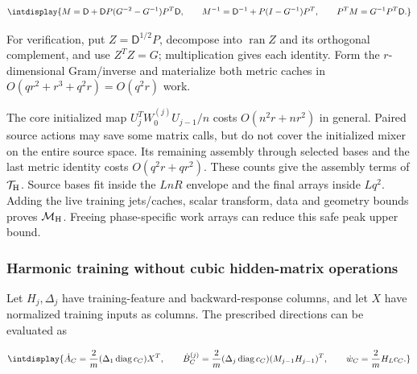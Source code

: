 \begingroup\renewcommand{\theHequation}{intdisplay.837}
\begin{equation}
\intdisplay{
M=\mathsf D+\mathsf DP(G^{-2}-G^{-1})P^T\mathsf D,\qquad
M^{-1}=\mathsf D^{-1}+P(I-G^{-1})P^T,\qquad
P^TM=G^{-1}P^T\mathsf D.
}
\label{int:eq-0410-cost-metric-factor-identities}
\end{equation}
\endgroup


For verification, put \(Z=\mathsf D^{1/2}P\), decompose into \(\operatorname{ran}Z\) and its orthogonal complement, and use \(Z^TZ=G\); multiplication gives each identity. Form the \(r\)-dimensional Gram/inverse and materialize both metric caches in \(O(qr^2+r^3+q^2r)=O(q^2r)\) work.



The core initialized map \(U_j^TW_0^{(j)}U_{j-1}/n\) costs \(O(n^2r+nr^2)\) in general. Paired source actions may save some matrix calls, but do not cover the initialized mixer on the entire source space. Its remaining assembly through selected bases and the last metric identity costs \(O(q^2r+qr^2)\). These counts give the assembly terms of \(\mathcal T_{\rm H}\). Source bases fit inside the \(LnR\) envelope and the final arrays inside \(Lq^2\). Adding the live training jets/caches, scalar transform, data and geometry bounds proves \(\mathcal M_{\rm H}\). Freeing phase-specific work arrays can reduce this safe peak upper bound.


\subsubsection{Harmonic training without cubic hidden-matrix operations}



Let \(H_j,\allowbreak \Delta_j\) have training-feature and backward-response columns, and let \(X\) have normalized training inputs as columns. The prescribed directions can be evaluated as


\begingroup\renewcommand{\theHequation}{intdisplay.838}
\begin{equation*}
\intdisplay{
\dot A_C=\frac2m(\Delta_1\operatorname{diag}c_C)X^T,\qquad
\dot B_C^{(j)}
=\frac2m(\Delta_j\operatorname{diag}c_C)(M_{j-1}H_{j-1})^T,
\qquad \dot w_C=\frac2mH_Lc_C.
}
\end{equation*}
\endgroup


